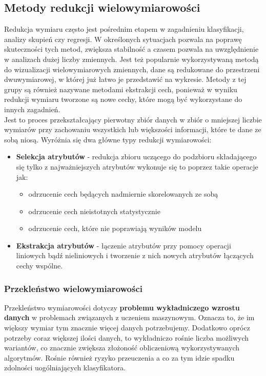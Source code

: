 \subsection{Metody redukcji wielowymiarowości}

Redukcja wymiaru często jest pośrednim etapem w zagadnieniu klasyfikacji, analizy skupień czy regresji. W określonych sytuacjach pozwala na poprawę skuteczności tych metod, zwiększa stabilność a czasem pozwala na uwzględnienie w analizach dużej liczby zmiennych. Jest też popularnie wykorzystywaną metodą do wizualizacji wielowymiarowych zmiennych, dane są redukowane do przestrzeni dwuwymiarowej, w której już łatwo je przedstawić na wykresie. Metody z tej grupy są również nazywane metodami ekstrakcji cech, ponieważ w wyniku redukcji wymiaru tworzone są nowe cechy, które mogą być wykorzystane do innych zagadnień. \\

Jest to proces przekształcający pierwotny zbiór danych w zbiór o mniejszej liczbie wymiarów
przy zachowaniu wszystkich lub większości informacji, które te dane ze sobą niosą. Wyróżnia
się dwa główne typy redukcji wymiarowości:

\begin{itemize}
	\item \textbf{Selekcja atrybutów} - redukcja zbioru uczącego do podzbioru składającego się tylko z najważniejszych atrybutów wykonuje się to poprzez takie operacje jak:
	\begin{itemize}
		\item odrzucenie cech będących nadmiernie skorelowanych ze sobą
		\item odrzucenie cech nieistotnych statystycznie
		\item odrzucenie cech, które nie poprawiają wyników modelu
	\end{itemize}
	\item \textbf{Ekstrakcja atrybutów} - łączenie atrybutów przy pomocy operacji liniowych bądź nieliniowych i tworzenie z nich nowych atrybutów łączących cechy wspólne.
\end{itemize}

\subsubsection{Przekleństwo wielowymiarowości}

Przekleństwo wymiarowości dotyczy \textbf{problemu wykładniczego wzrostu danych} w problemach związanych z uczeniem maszynowym. Oznacza to, że im większy wymiar tym znacznie więcej danych potrzebujemy. Dodatkowo oprócz potrzeby coraz większej ilości danych, to wykładniczo rośnie liczba możliwych wariantów, co znacznie zwiększa złożoność obliczeniową wykorzystywanych algorytmów. Rośnie również ryzyko przeuczenia a co za tym idzie spadku zdolności uogólniających klasyfikatora.

